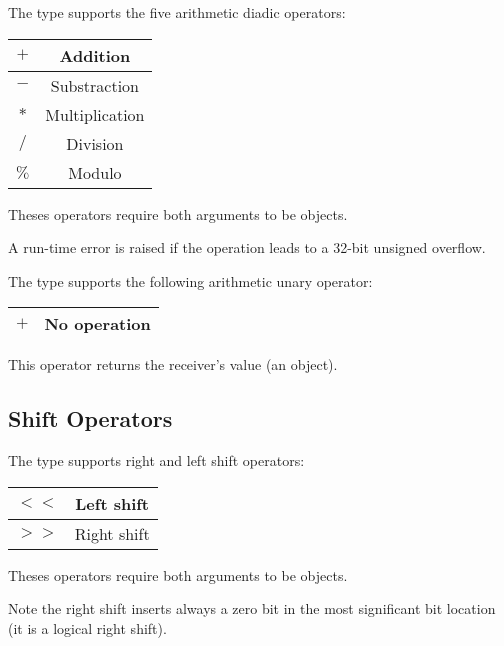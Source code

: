 The  type supports the five arithmetic diadic operators:\newline

\begin{tabular}{|c|c|}
\hline
$+$ & Addition \\
\hline
$-$ & Substraction \\
\hline
$*$ & Multiplication \\
\hline
$/$ & Division \\
\hline
$\%$ & Modulo \\
\hline
\end{tabular}\newline

Theses operators require both arguments to be  objects.\newline

A run-time error is raised if the operation leads to a 32-bit unsigned overflow.

The  type supports the following arithmetic unary operator:\newline

\begin{tabular}{|c|c|}
\hline
$+$ & No operation \\
\hline
\end{tabular}\newline

This operator returns the receiver's value (an   object).






\subsection{Shift Operators}


The  type supports right and left shift operators:\newline

\begin{tabular}{|c|c|}
\hline
$<<$ & Left shift \\
\hline
$>>$ & Right shift \\
\hline
\end{tabular}\newline

Theses operators require both arguments to be  objects.\newline

Note the right shift inserts always a zero bit in the most significant bit location (it is a logical right shift).\newline

